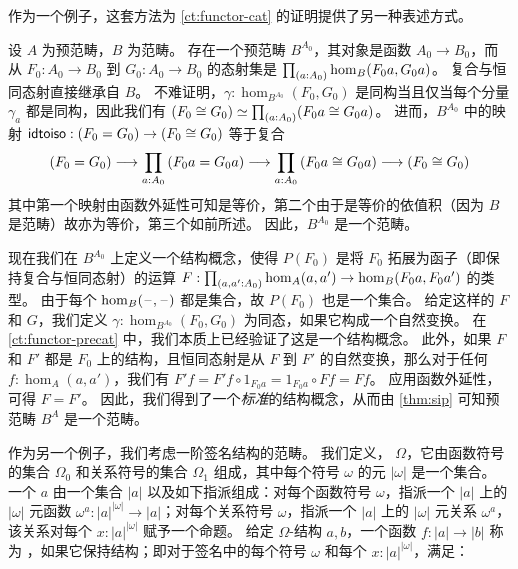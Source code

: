 作为一个例子，这套方法为 \cref{ct:functor-cat} 的证明提供了另一种表述方式。

\begin{eg}\label{ct:sip-functor-cat}
  设 $A$ 为预范畴，$B$ 为范畴。
  存在一个预范畴 $B^{A_0}$，其对象是函数 $A_0 \to B_0$，而从 $F_0:A_0 \to B_0$ 到 $G_0:A_0 \to B_0$ 的态射集是 $\prd{a:A_0} \hom_B(F_0 a, G_0 a)$。
  复合与恒同态射直接继承自 $B$。
  不难证明，$\gamma:\hom_{B^{A_0}}(F_0, G_0)$ 是同构当且仅当每个分量 $\gamma_a$ 都是同构，因此我们有 $\eqv{(F_0 \cong G_0)}{\prd{a:A_0} (F_0 a \cong G_0 a)}$。
  进而，$B^{A_0}$ 中的映射 $\mathsf{idtoiso} : (F_0 = G_0) \to (F_0 \cong G_0)$ 等于复合
  \[ (F_0 = G_0) \longrightarrow \prd{a:A_0} (F_0 a  = G_0 a) \longrightarrow \prd{a:A_0} (F_0 a \cong G_0 a) \longrightarrow (F_0 \cong G_0) \]
  其中第一个映射由函数外延性可知是等价，第二个由于是等价的依值积（因为 $B$ 是范畴）故亦为等价，第三个如前所述。
  因此，$B^{A_0}$ 是一个范畴。

  现在我们在 $B^{A_0}$ 上定义一个结构概念，使得 $P(F_0)$ 是将 $F_0$ 拓展为函子（即保持复合与恒同态射）的运算 $F:\prd{a,a':A_0} \hom_A(a,a') \to \hom_B(F_0 a,F_0 a')$ 的类型。
  由于每个 $\hom_B(\mathord{\hspace{1pt}\text{--}\hspace{1pt}},\mathord{\hspace{1pt}\text{--}\hspace{1pt}})$ 都是集合，故 $P(F_0)$ 也是一个集合。
  给定这样的 $F$ 和 $G$，我们定义 $\gamma:\hom_{B^{A_0}}(F_0, G_0)$ 为同态，如果它构成一个自然变换。
  在 \cref{ct:functor-precat} 中，我们本质上已经验证了这是一个结构概念。
  此外，如果 $F$ 和 $F'$ 都是 $F_0$ 上的结构，且恒同态射是从 $F$ 到 $F'$ 的自然变换，那么对于任何 $f:\hom_A(a,a')$，我们有 $F'f = F'f \circ 1_{F_0 a} = 1_{F_0 a}\circ F f = F f$。
  应用函数外延性，可得 $F = F'$。
  因此，我们得到了一个\emph{标准}的结构概念，从而由 \cref{thm:sip} 可知预范畴 $B^A$ 是一个范畴。
\end{eg}

作为另一个例子，我们考虑一阶签名结构的范畴。
我们定义，
%
%
$\Omega$，它由函数符号的集合 $\Omega_0$ 和关系符号的集合 $\Omega_1$ 组成，其中每个符号 $\omega$ 的元 $|\omega|$ 是一个集合。
一个
%
%
$a$ 由一个集合 $|a|$ 以及如下指派组成：对每个函数符号 $\omega$，指派一个 $|a|$ 上的 $|\omega|$ 元函数 $\omega^a:|a|^{|\omega|}\to |a|$；对每个关系符号 $\omega$，指派一个 $|a|$ 上的 $|\omega|$ 元关系 $\omega^a$，该关系对每个 $x:|a|^{|\omega|}$ 赋予一个命题。
给定 $\Omega$-结构 $a, b$，一个函数 $f: |a| \to |b|$ 称为
%
%
，如果它保持结构；即对于签名中的每个符号 $\omega$ 和每个 $x:|a|^{|\omega|}$，满足：

